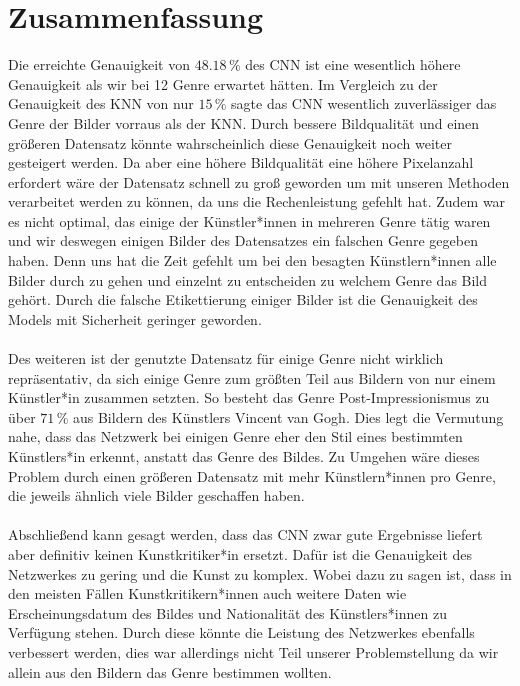 \section{Zusammenfassung}
Die erreichte Genauigkeit von $48.18 \, \%$ des CNN ist eine wesentlich höhere Genauigkeit als wir bei 12 Genre erwartet hätten.
Im Vergleich zu der Genauigkeit des KNN von nur $15 \, \%$ sagte das CNN wesentlich zuverlässiger das Genre der Bilder vorraus als der KNN.
Durch bessere Bildqualität und einen größeren Datensatz könnte wahrscheinlich diese Genauigkeit noch weiter gesteigert werden.
Da aber eine höhere Bildqualität eine höhere Pixelanzahl erfordert wäre der Datensatz schnell zu groß geworden um mit unseren Methoden verarbeitet werden zu können, da uns die Rechenleistung gefehlt hat. 
Zudem war es nicht optimal, das einige der Künstler*innen in mehreren Genre tätig waren und wir deswegen einigen Bilder des Datensatzes ein falschen Genre gegeben haben.
Denn uns hat die Zeit gefehlt um bei den besagten Künstlern*innen alle Bilder durch zu gehen und einzelnt zu entscheiden zu welchem Genre das Bild gehört.
Durch die falsche Etikettierung einiger Bilder ist die Genauigkeit des Models mit Sicherheit geringer geworden.
\\\\
Des weiteren ist der genutzte Datensatz für einige Genre nicht wirklich repräsentativ, da sich einige Genre zum größten Teil aus Bildern von nur einem Künstler*in zusammen setzten.
So besteht das Genre Post-Impressionismus zu über $71\,\%$ aus Bildern des Künstlers Vincent van Gogh.
Dies legt die Vermutung nahe, dass das Netzwerk bei einigen Genre eher den Stil eines bestimmten Künstlers*in erkennt, anstatt das Genre des Bildes.
Zu Umgehen wäre dieses Problem durch einen größeren Datensatz mit mehr Künstlern*innen pro Genre, die jeweils ähnlich viele Bilder geschaffen haben.
\\\\
Abschließend kann gesagt werden, dass das CNN zwar gute Ergebnisse liefert aber definitiv keinen Kunstkritiker*in ersetzt.
Dafür ist die Genauigkeit des Netzwerkes zu gering und die Kunst zu komplex.
Wobei dazu zu sagen ist, dass in den meisten Fällen Kunstkritikern*innen auch weitere Daten wie Erscheinungsdatum des Bildes und Nationalität des Künstlers*innen zu Verfügung stehen.
Durch diese könnte die Leistung des Netzwerkes ebenfalls verbessert werden, dies war allerdings nicht Teil unserer Problemstellung da wir allein aus den Bildern das Genre bestimmen wollten.
